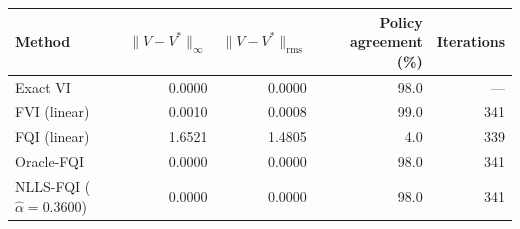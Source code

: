 \begin{tabular}{lrrrr}
\hline
Method & $\|V - V^*\|_\infty$ & $\|V - V^*\|_\text{rms}$ & Policy agreement (\%) & Iterations \\
\hline
Exact VI & 0.0000 & 0.0000 & 98.0 & --- \\
FVI (linear) & 0.0010 & 0.0008 & 99.0 & 341 \\
FQI (linear) & 1.6521 & 1.4805 & 4.0 & 339 \\
Oracle-FQI & 0.0000 & 0.0000 & 98.0 & 341 \\
NLLS-FQI ($\hat{\alpha} = 0.3600$) & 0.0000 & 0.0000 & 98.0 & 341 \\
\hline
\end{tabular}